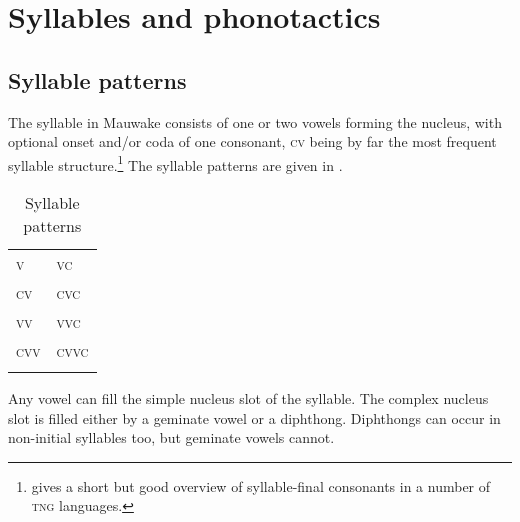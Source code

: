 \begin{table}
\caption{Orthographic symbols for Mauwake phonemes}
\label{tab:4:orthosymbols}
\end{table}

\section{Syllables and phonotactics}\label{sec:2:2}


\subsection{Syllable patterns}


The syllable in Mauwake consists of one or two vowels forming the nucleus, with optional onset and/or coda of one consonant, \textsc{cv} being by far the most frequent syllable structure.\footnote{\citet[13]{Reesink1987} gives a short but good overview of syllable-final consonants in a number of \textsc{tng} languages.} The syllable patterns are given in .

\begin{table}
 \caption{Syllable patterns}
\label{tab:2:syllablepatterns}
\begin{tabular}{ll}
\mytoprule
\textsc{v}  &  \textsc{vc}\\
\textsc{cv} &  \textsc{cvc}\\
\textsc{vv} &  \textsc{vvc}\\
\textsc{cvv} & \textsc{cvvc} \\
\mybottomrule
\end{tabular}
\end{table}

Any vowel can fill the simple nucleus slot of the syllable. The complex nucleus slot is filled either by a geminate vowel or a diphthong. Diphthongs can occur in non-initial syllables too, but geminate vowels cannot. 

